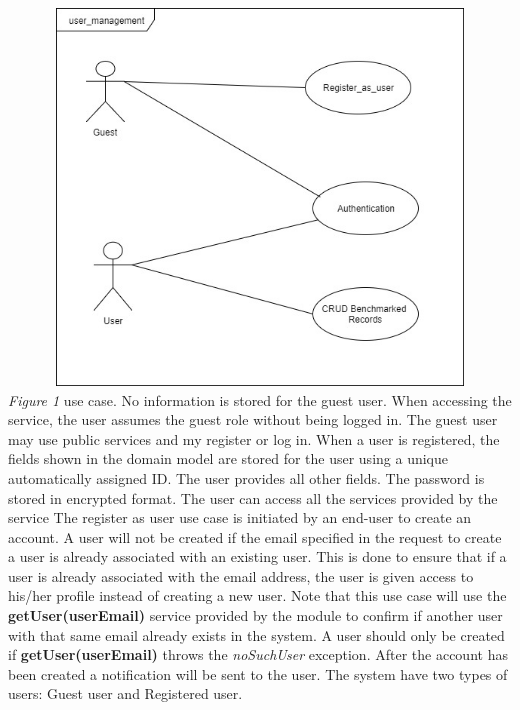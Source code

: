 \documentclass[runningheads,a4paper]{article}
\begin{document}
\includegraphics[width=15cm , height=10cm]{../Images/userDiagram.jpg}
\newline 
\textit{Figure 1} use case.
\newline
\newline No information is stored for the guest user. When accessing the service, the user
assumes the guest role without being logged in. The guest user may use public
services and my register or log in.
When a user is registered, the fields shown in the domain model are stored for the
user using a unique automatically assigned ID. The user provides all other fields. The
password is stored in encrypted format. The user can access all the services provided by the service
The register as user  use case is initiated by an end-user to create an account.\newline\newline
A user will not be created if the email specified in the request to create a user is already
associated with an existing user. This is done to ensure that if a user is already associated
with the email address, the user is given access to his/her profile instead of creating a new
user.\newline\newline
Note that this use case will use the \textbf{getUser(userEmail)} service provided by the module to
confirm if another user with that same email already exists in the system. A user should
only be created if \textbf{getUser(userEmail)} throws the \textit{noSuchUser} exception.
After the account has been created a notification will be sent to the user. The system have two types of users: Guest user and Registered user.
\end{document}
